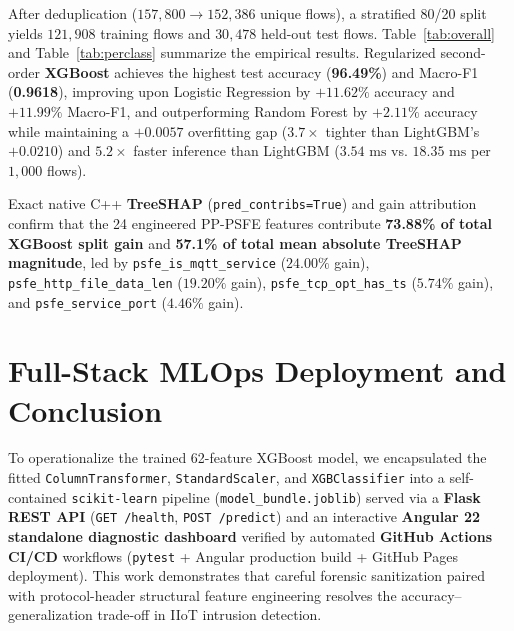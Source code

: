 \documentclass[conference]{IEEEtran}
\begin{document}
After deduplication ($157,800 \rightarrow 152,386$ unique flows), a stratified 80/20 split yields $121,908$ training flows and $30,478$ held-out test flows. Table~\ref{tab:overall} and Table~\ref{tab:perclass} summarize the empirical results. Regularized second-order \textbf{XGBoost} achieves the highest test accuracy (\textbf{96.49\%}) and Macro-F1 (\textbf{0.9618}), improving upon Logistic Regression by $+11.62\%$ accuracy and $+11.99\%$ Macro-F1, and outperforming Random Forest by $+2.11\%$ accuracy while maintaining a $+0.0057$ overfitting gap ($3.7\times$ tighter than LightGBM's $+0.0210$) and $5.2\times$ faster inference than LightGBM ($3.54\text{ ms}$ vs. $18.35\text{ ms}$ per $1,000$ flows).

Exact native C++ \textbf{TreeSHAP} (\texttt{pred\_contribs=True}) and gain attribution confirm that the 24 engineered PP-PSFE features contribute \textbf{73.88\% of total XGBoost split gain} and \textbf{57.1\% of total mean absolute TreeSHAP magnitude}, led by \texttt{psfe\_is\_mqtt\_service} ($24.00\%$ gain), \texttt{psfe\_http\_file\_data\_len} ($19.20\%$ gain), \texttt{psfe\_tcp\_opt\_has\_ts} ($5.74\%$ gain), and \texttt{psfe\_service\_port} ($4.46\%$ gain).

\section{Full-Stack MLOps Deployment and Conclusion}
To operationalize the trained 62-feature XGBoost model, we encapsulated the fitted \texttt{ColumnTransformer}, \texttt{StandardScaler}, and \texttt{XGBClassifier} into a self-contained \texttt{scikit-learn} pipeline (\texttt{model\_bundle.joblib}) served via a \textbf{Flask REST API} (\texttt{GET /health}, \texttt{POST /predict}) and an interactive \textbf{Angular 22 standalone diagnostic dashboard} verified by automated \textbf{GitHub Actions CI/CD} workflows (\texttt{pytest} + Angular production build + GitHub Pages deployment). This work demonstrates that careful forensic sanitization paired with protocol-header structural feature engineering resolves the accuracy--generalization trade-off in IIoT intrusion detection.
\end{document}
